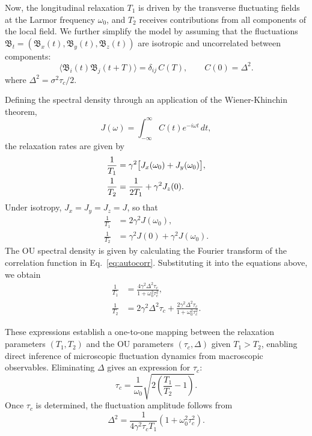 \documentclass[%
 reprint,
 amsmath,amssymb,
 aps,
]{revtex4-2}
\begin{document}
Now, the longitudinal relaxation $T_1$ is driven by the transverse fluctuating fields at the Larmor frequency $\omega_0$, and $T_2$ receives contributions from all components of the local field. We further simplify the model by assuming that the fluctuations $\boldsymbol{\mathfrak{B}}_t = \left(\mathfrak{B}_x(t),\mathfrak{B}_y(t),\mathfrak{B}_z(t)\right)$ are isotropic and uncorrelated between components:
\begin{equation*}
    \langle \mathfrak{B}_i (t)\mathfrak{B}_j (t+T)\rangle
    =
    \delta_{ij}\,C(T),
    \qquad C(0)=\Delta^2.
\end{equation*}
where $\Delta^2 = \sigma^2\tau_c / 2$.

Defining the spectral density through an application of the Wiener-Khinchin theorem,
\begin{equation*}
    J(\omega)
    =
    \int_{-\infty}^{\infty} C(t)e^{-i\omega t}\,dt,
\end{equation*}
the relaxation rates are given by \cite{slichter1990principles}
\begin{align}
    \frac{1}{T_1} &= \gamma^2 \big[ J_x(\omega_0) + J_y(\omega_0) \big], \notag \\
    \frac{1}{T_2} &= \frac{1}{2T_1} + \gamma^2 J_z(0).
    \label{eq:T2_dephasing_energy}
\end{align}
Under isotropy, $J_x = J_y = J_z = J$, so that
\begin{align*}
    \frac{1}{T_1} &= 2\gamma^2 J(\omega_0), \\
    \frac{1}{T_2} &= \gamma^2 J(0) + \gamma^2 J(\omega_0).
\end{align*}
The OU spectral density is given by calculating the Fourier transform of the correlation function in Eq.~\ref{eq:autocorr}. Substituting it into the equations above, we obtain
\begin{align*}
    \frac{1}{T_1}
    &=
    \frac{4\gamma^2 \Delta^2 \tau_c}{1+\omega_0^2 \tau_c^2}, \\
    \frac{1}{T_2}
    &=
    2\gamma^2 \Delta^2 \tau_c
    +
    \frac{2\gamma^2 \Delta^2 \tau_c}{1+\omega_0^2 \tau_c^2}.
\end{align*}

These expressions establish a one-to-one mapping between the relaxation parameters $\left(T_1, T_2\right)$ and the OU parameters $(\tau_c, \Delta)$ given $T_1 > T_2$, enabling direct inference of microscopic fluctuation dynamics from macroscopic observables. Eliminating $\Delta$ gives an expression for $\tau_c$:
\begin{equation}
    \tau_c
    =
    \frac{1}{\omega_0}
    \sqrt{2\left(\frac{T_1}{T_2} - 1\right)}.
    \label{eq:tau_c}
\end{equation}
Once $\tau_c$ is determined, the fluctuation amplitude follows from
\begin{equation}
    \Delta^2
    =
    \frac{1}{4\gamma^2 \tau_c T_1}
    \left(1+\omega_0^2 \tau_c^2\right).
    \label{eq:delta_sq}
\end{equation}
\end{document}
